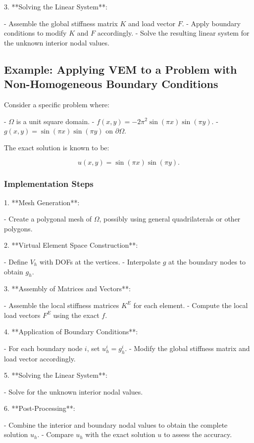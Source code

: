 \documentclass[class=article, crop=false]{standalone}
\begin{document}
3. **Solving the Linear System**:

   - Assemble the global stiffness matrix $K$ and load vector $F$.
   - Apply boundary conditions to modify $K$ and $F$ accordingly.
   - Solve the resulting linear system for the unknown interior nodal values.

\subsection{Example: Applying VEM to a Problem with Non-Homogeneous Boundary Conditions}

Consider a specific problem where:

- $\Omega$ is a unit square domain.
- $f(x, y) = -2 \pi^2 \sin(\pi x) \sin(\pi y)$.
- $g(x, y) = \sin(\pi x) \sin(\pi y)$ on $\partial \Omega$.

The exact solution is known to be:

\[
u(x, y) = \sin(\pi x) \sin(\pi y).
\]

\subsubsection{Implementation Steps}

1. **Mesh Generation**:

   - Create a polygonal mesh of $\Omega$, possibly using general quadrilaterals or other polygons.

2. **Virtual Element Space Construction**:

   - Define $V_h$ with DOFs at the vertices.
   - Interpolate $g$ at the boundary nodes to obtain $g_h$.

3. **Assembly of Matrices and Vectors**:

   - Assemble the local stiffness matrices $K^E$ for each element.
   - Compute the local load vectors $F^E$ using the exact $f$.

4. **Application of Boundary Conditions**:

   - For each boundary node $i$, set $u_h^i = g_h^i$.
   - Modify the global stiffness matrix and load vector accordingly.

5. **Solving the Linear System**:

   - Solve for the unknown interior nodal values.

6. **Post-Processing**:

   - Combine the interior and boundary nodal values to obtain the complete solution $u_h$.
   - Compare $u_h$ with the exact solution $u$ to assess the accuracy.
\end{document}
